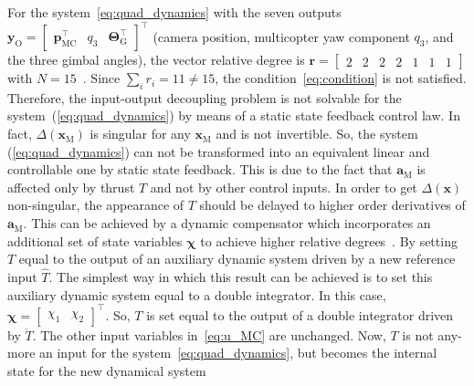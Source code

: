 \documentclass[letterpaper, 10 pt, conference]{ieeeconf}  %
\begin{document}
For the system~\eqref{eq:quad_dynamics} with the seven outputs $\mathbf{y}_\text{O} = \begin{bmatrix} \mathbf{p}_\text{MC}^\top & q_3 & \boldsymbol{\Theta}_\text{G}^\top \end{bmatrix}^\top$ (camera position, multicopter yaw component $q_3$, and the three gimbal angles), the vector relative degree is $\mathbf{r} = \begin{bmatrix}2 & 2 & 2 & 2 & 1 & 1 & 1\end{bmatrix}$ with $N = 15$~\cite{sarabakha2025data}. Since $\sum_{i} r_i = 11 \neq 15$, the condition~\eqref{eq:condition} is not satisfied. Therefore, the input-output decoupling problem is not solvable for the system~(\ref{eq:quad_dynamics}) by means of a static state feedback control law. In fact, $\Delta(\mathbf{x}_\text{M})$ is singular for any $\mathbf{x}_\text{M}$ and is not invertible. So, the system (\ref{eq:quad_dynamics}) can not be transformed into an equivalent linear and controllable one by static state feedback. This is due to the fact that $\mathbf{a}_\text{M}$ is affected only by thrust $T$ and not by other control inputs. In order to get $\Delta(\mathbf{x})$ non-singular, the appearance of $T$ should be delayed to higher order derivatives of $\mathbf{a}_\text{M}$. This can be achieved by a dynamic compensator which incorporates an additional set of state variables $\boldsymbol{\chi}$ to achieve higher relative degrees~\cite{Mistler2001ROMAN}.
By setting $T$ equal to the output of an auxiliary dynamic system driven by a new reference input $\hat{T}$. The simplest way in which this result can be achieved is to set this auxiliary dynamic system equal to a double integrator. In this case, $\boldsymbol{\chi} = \begin{bmatrix} \chi_1 & \chi_2 \end{bmatrix}^\top$. So, $T$ is set equal to the output of a double integrator driven by $\ddot{T}$. The other input variables in~\eqref{eq:u_MC} are unchanged.
Now, $T$ is not any-more an input for the system~\eqref{eq:quad_dynamics}, but becomes the internal state for the new dynamical system
\end{document}
